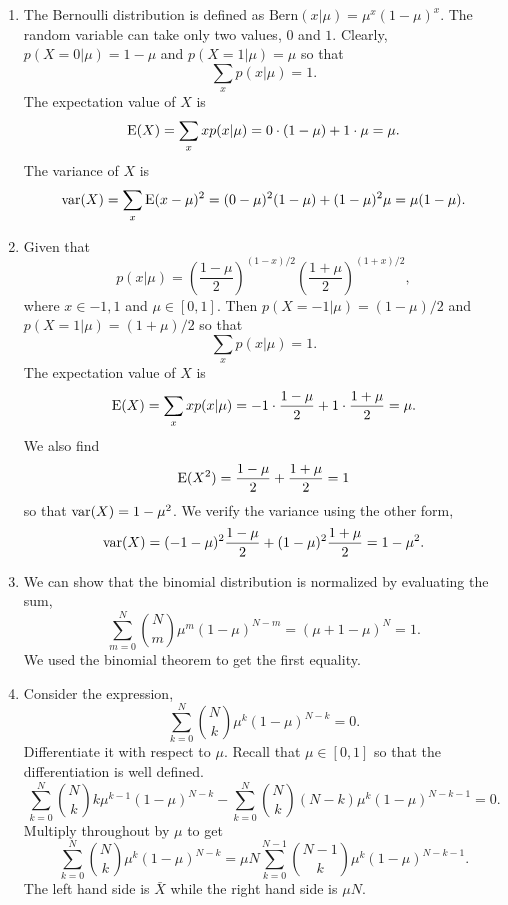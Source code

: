 \begin{enumerate}
\item The Bernoulli distribution is defined as $\mathrm{Bern}(x|\mu) = \mu^x(1 - \mu)^x$. The 
random variable can take only two values, $0$ and $1$. Clearly, $p(X=0|\mu) = 1 - \mu$ and 
$p(X=1|\mu) = \mu$ so that
\[
\sum_x p(x|\mu) = 1.
\]
The expectation value of $X$ is
\[
\operatorname{E}(X) = \sum_x xp(x|\mu) = 0\cdot(1 - \mu) + 1\cdot\mu = \mu.
\]
The variance of $X$ is
\[
\operatorname{var}(X) = \sum_x \operatorname{E}(x - \mu)^2 = (0 - \mu)^2(1 - \mu) + (1 - \mu)^2\mu = \mu(1 - \mu).
\]

\item Given that
\[
p(x|\mu) = \left(\frac{1-\mu}{2}\right)^{(1-x)/2}\left(\frac{1+\mu}{2}\right)^{(1+x)/2},
\]
where $x \in {-1, 1}$ and $\mu \in [0, 1]$. Then $p(X=-1|\mu) = (1 - \mu)/2$ and $p(X=1|\mu)
= (1 + \mu)/2$ so that 
\[
\sum_x p(x|\mu) = 1.
\]
The expectation value of $X$ is
\[
\operatorname{E}(X) = \sum_x xp(x|\mu) = -1\cdot\frac{1 - \mu}{2} + 1\cdot\frac{1 + \mu}{2} = \mu.
\]
We also find
\[
\operatorname{E}(X^2) = \frac{1 - \mu}{2} + \frac{1 + \mu}{2} = 1
\]
so that $\operatorname{var}(X) = 1 - \mu^2$. We verify the variance using the other form,
\[
\operatorname{var}(X) = (-1 - \mu)^2\frac{1 - \mu}{2} + (1 - \mu)^2\frac{1 + \mu}{2} = 1 - \mu^2.
\]

\item We can show that the binomial distribution is normalized by evaluating the sum,
\[
\sum_{m=0}^N\binom{N}{m}\mu^m(1 - \mu)^{N-m} = (\mu + 1 - \mu)^N = 1.
\]
We used the binomial theorem to get the first equality.

\item Consider the expression,
\[
\sum_{k=0}^N \binom{N}{k}\mu^k(1 - \mu)^{N-k} = 0.
\]
Differentiate it with respect to $\mu$. Recall that $\mu \in [0, 1]$ so that the differentiation 
is well defined.
\[
\sum_{k=0}^N\binom{N}{k}k\mu^{k-1}(1 - \mu)^{N-k} - \sum_{k=0}^N\binom{N}{k}(N-k)\mu^k(1 - \mu)^{N-k-1} = 0.
\]
Multiply throughout by $\mu$ to get
\[
\sum_{k=0}^N\binom{N}{k}\mu^k(1 - \mu)^{N-k} = \mu N\sum_{k=0}^{N-1}\binom{N-1}{k}\mu^k(1 - \mu)^{N-k-1}.
\]
The left hand side is $\bar{X}$ while the right hand side is $\mu N$.


\end{enumerate}
